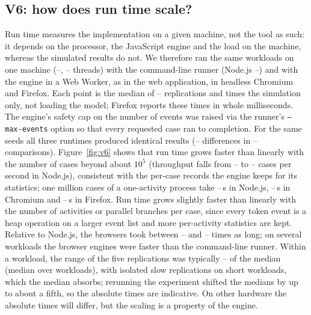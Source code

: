 \documentclass[preprint,12pt,nonatbib]{elsarticle}
\providecommand{\VsixMillion}{--}\providecommand{\VsixRate}{--}\providecommand{\VsixCpu}{--}\providecommand{\VsixNode}{--}\providecommand{\VsixChromium}{--}\providecommand{\VsixFirefox}{--}\providecommand{\VsixReps}{--}\providecommand{\VsixMismatches}{--}\providecommand{\VsixCompared}{--}\providecommand{\VsixMillionChromium}{--}\providecommand{\VsixMillionFirefox}{--}\providecommand{\VsixRatioMin}{--}\providecommand{\VsixRatioMax}{--}\providecommand{\VsixThreads}{--}\providecommand{\VsixSpread}{--}\providecommand{\VsixRateSmall}{--}
\begin{document}
\begin{table}[t]
\centering\small
\caption{V5: share of \VfiveN{} independent decision trials in which the truly best option was chosen, by random-number mode and replication budget per option; brackets give the 95\,\% Wilson interval. The reference ranking uses a disjoint set of \VfiveRef{} replications per option.}
\label{tab:v5}
\resizebox{\linewidth}{!}{}
\end{table}

\begin{table}[t]
\centering\small
\caption{V5: variance of the difference to the baseline in mean cycle time (s$^2$) for one run per option.}
\label{tab:v5var}
\resizebox{\linewidth}{!}{}
\end{table}

\subsection{V6: how does run time scale?}
\label{sec:v6}
Run time measures the implementation on a given machine, not the tool as such: it depends on the processor, the JavaScript engine and the load on the machine, whereas the simulated results do not. We therefore ran the same workloads on one machine (\VsixCpu, \VsixThreads{} threads) with the command-line runner (Node.js \VsixNode) and with the engine in a Web Worker, as in the web application, in headless Chromium and Firefox. Each point is the median of \VsixReps{} replications and times the simulation only, not loading the model; Firefox reports these times in whole milliseconds. The engine's safety cap on the number of events was raised via the runner's \texttt{--max-events} option so that every requested case ran to completion. For the same seeds all three runtimes produced identical results (\VsixMismatches{} differences in \VsixCompared{} comparisons). Figure~\ref{fig:v6} shows that run time grows faster than linearly with the number of cases beyond about $10^5$ (throughput falls from \VsixRateSmall{} to \VsixRate{} cases per second in Node.js), consistent with the per-case records the engine keeps for its statistics; one million cases of a one-activity process take \VsixMillion\,s in Node.js, \VsixMillionChromium\,s in Chromium and \VsixMillionFirefox\,s in Firefox. Run time grows slightly faster than linearly with the number of activities or parallel branches per case, since every token event is a heap operation on a larger event list and more per-activity statistics are kept. Relative to Node.js, the browsers took between \VsixRatioMin{} and \VsixRatioMax{} times as long; on several workloads the browser engines were faster than the command-line runner. Within a workload, the range of the five replications was typically \VsixSpread{} of the median (median over workloads), with isolated slow replications on short workloads, which the median absorbs; rerunning the experiment shifted the medians by up to about a fifth, so the absolute times are indicative. On other hardware the absolute times will differ, but the scaling is a property of the engine.
\end{document}
